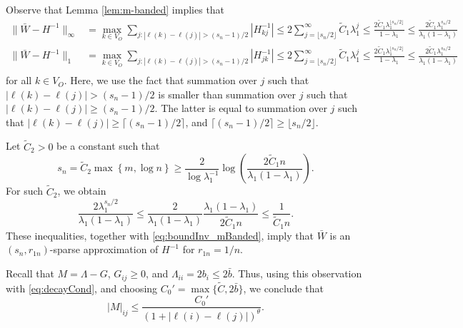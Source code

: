 \documentclass[opre,nonblindrev]{informs3} %
\begin{document}
\begin{APPENDIX}{}
\noindent{}	
Observe that  Lemma \ref{lem:m-banded} implies that
\begin{equation} \label{eq:boundInv_mBanded}
\begin{aligned}
\| \bar{W} - H^{-1} \|_\infty &= \max_{k\in V_O}
\sum_{j : |\ell(k)-\ell(j)|> (s_n-1) /2}|H^{-1}_{kj}|
\leq 2\sum_{j= \lfloor s_n/2 \rfloor }^{\infty} \tilde{C}_1 \lambda_1^{j} \leq \frac{2 \tilde{C}_1 \lambda_1^{\lfloor s_n/2 \rfloor}}{1-\lambda_1} \leq \frac{2 \tilde{C}_1 \lambda_1^{s_n/2}}{\lambda_1(1-\lambda_1)} \\
\| \bar{W} - H^{-1} \|_1 &= \max_{k\in V_O}
\sum_{j : |\ell(k)-\ell(j)|> (s_n-1)/2}|H^{-1}_{jk}| \leq 2\sum_{j= \lfloor s_n/2 \rfloor }^{\infty} \tilde{C}_1 \lambda_1^{j} \leq \frac{2 \tilde{C}_1 \lambda_1^{\lfloor s_n/2 \rfloor}}{1-\lambda_1} \leq \frac{2 \tilde{C}_1 \lambda_1^{s_n/2}}{\lambda_1(1-\lambda_1)} \\
\end{aligned}
\end{equation}
for all $k \in V_O$.
Here, we use the fact that summation over $j$ such that $|\ell(k)-\ell(j)| > (s_n-1)/2$
is smaller than summation over $j$ such that $|\ell(k)-\ell(j)| \geq (s_n-1)/2$.
The latter is equal to summation over $j$ such that
$|\ell(k)-\ell(j)| \geq \lceil (s_n-1)/2 \rceil $, and
$\lceil (s_n-1)/2 \rceil\geq \lfloor s_n/2  \rfloor$.


Let
$\tilde{C}_2>0$ be a constant such that 
$$s_n=\tilde{C}_2 \max\left\{m,  \log {n}  \right\} 
\geq  \frac{2}{\log \lambda_1^{-1}} \log \left( \frac{2\tilde C_1 n}{\lambda_1(1-\lambda_1)} \right)  . $$
For such  $\tilde{C}_2$, we obtain
\[
\frac{2 \lambda_1^{s_n/2}}{\lambda_1(1-\lambda_1)}
\leq
\frac{2}{\lambda_1(1-\lambda_1)}  \frac{\lambda_1 (1-\lambda_1)}{2 \tilde{C}_1 n} \leq \frac{1}{\tilde{C}_1 n}.%
\]
These inequalities, together with \eqref{eq:boundInv_mBanded},
imply that
$\bar{W}$ is an $(s_n,r_{1n})$-sparse approximation
of  $H^{-1}$
for
$r_{1n}=1/n$.
\hfill
\halmos
\endproof	


\noindent{}
Recall that $M=\Lambda-G$, $G_{ij}\geq 0$, and $\Lambda_{ii}=2b_i \leq 2\bar{b}$.
Thus,
using this observation with \eqref{eq:decayCond}, and
choosing $C_0'=\max\{\tilde{C}, 2\bar b\}$, we conclude that
\begin{equation}\label{eq:decayPolM_result}
|M|_{ij}\leq  \frac{ C_0'}{(1+ |\ell(i)-\ell(j)|)^\theta}.
\end{equation}


\end{APPENDIX}
\end{document}
